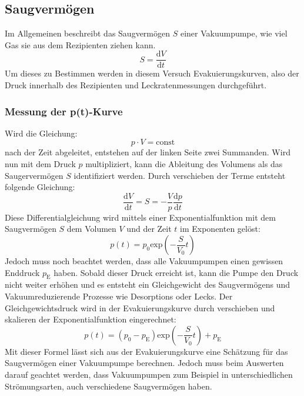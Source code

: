 	\subsection{Saugvermögen}

		Im Allgemeinen beschreibt das Saugvermögen $S$ einer Vakuumpumpe, wie viel Gas sie aus dem Rezipienten ziehen kann. 
		\begin{equation}
			S = \frac{\text{d}V}{\text{d}t}
		\end{equation}
		Um dieses zu Bestimmen werden in diesem Versuch Evakuierungskurven, also der Druck innerhalb des Rezipienten und Leckratenmessungen durchgeführt.

		\subsubsection{Messung der p(t)-Kurve}
			
			Wird die Gleichung:
			\begin{equation}
				p \cdot V = \text{const}
			\end{equation}
			nach der Zeit abgeleitet, entstehen auf der linken Seite zwei Summanden. 
			Wird nun mit dem Druck $p$ multipliziert, kann die Ableitung des Volumens als das Saugervermögen $S$ identifiziert werden.
			Durch verschieben der Terme entsteht folgende Gleichung:
			\begin{equation}
				\frac{\text{d}V}{\text{d}t} = S = - \frac{V}{p} \frac{\text{d}p}{\text{d}t}
			\end{equation}
			Diese Differentialgleichung wird mittels einer Exponentialfunktion mit dem Saugvermögen $S$ dem Volumen $V$ und der Zeit $t$ im Exponenten gelöst:
			\begin{equation}
				p(t) = p_0 \text{exp}\left( - \frac{S}{V_0}t \right)
			\end{equation}
			Jedoch muss noch beachtet werden, dass alle Vakuumpumpen einen gewissen Enddruck $p_\text{E}$ haben. 
			Sobald dieser Druck erreicht ist, kann die Pumpe den Druck nicht weiter erhöhen und es entsteht ein Gleichgewicht des Saugvermögens und Vakuumreduzierende Prozesse wie Desorptions oder Lecks.
			Der Gleichgewichtsdruck wird in der Evakuierungskurve durch verschieben und skalieren der Exponentialfunktion eingerechnet:
			\begin{equation}
				p(t) = (p_0 - p_\text{E}) \text{exp}\left( - \frac{S}{V_0}t \right) + p_\text{E}
			\end{equation}
			Mit dieser Formel lässt sich aus der Evakuierungskurve eine Schätzung für das Saugvermögen einer Vakuumpumpe berechnen.
			Jedoch muss beim Auswerten darauf geachtet werden, dass Vakuumpumpen zum Beispiel in unterschiedlichen Strömungsarten, auch verschiedene Saugvermögen haben.
			
